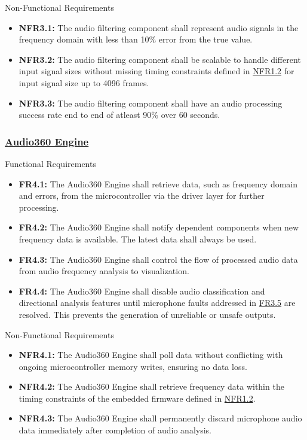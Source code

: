 \documentclass[12pt]{article}
\theoremstyle{definition}
\begin{document}
Non-Functional Requirements
\begin{itemize}
  \item \label{NFR3_1}\textbf{NFR3.1:} The audio filtering component shall
  represent audio signals in the frequency domain with less than 10\% error from
  the true value.
  \item \label{NFR3_2}\textbf{NFR3.2:} The audio filtering component shall be
  scalable to handle different input signal sizes without missing timing
  constraints defined in \hyperref[NFR1_2]{NFR1.2} for input signal size up to
  4096 frames.

  \item \label{NFR3_3}\textbf{NFR3.3:} The audio filtering component shall have
  an audio processing success rate end to end of atleast 90\% over 60 seconds.
\end{itemize}

\subsubsection{\hyperref[comp:audio360Engine]{Audio360 Engine}} Functional
Requirements
\begin{itemize}
  \item \label{FR4_1}\textbf{FR4.1:} The Audio360 Engine shall retrieve data,
  such as frequency domain and errors, from the microcontroller via the driver
  layer for further processing.

  \item \label{FR4_2}\textbf{FR4.2:} The Audio360 Engine shall notify dependent
  components when new frequency data is available. The latest data shall always
  be used.

  \item \label{FR4_3}\textbf{FR4.3:} The Audio360 Engine shall control the flow
  of processed audio data from audio frequency analysis to visualization.

  \item \label{FR4_4}\textbf{FR4.4:} The Audio360 Engine shall disable audio
  classification and directional analysis features until microphone faults
  addressed in \hyperref[FR3_5]{FR3.5} are resolved. This prevents the
  generation of unreliable or unsafe outputs.
\end{itemize}

Non-Functional Requirements
\begin{itemize}
  \item \label{NFR4_1}\textbf{NFR4.1:} The Audio360 Engine shall poll data
  without conflicting with ongoing microcontroller memory writes, ensuring no
  data loss.

  \item \label{NFR4_2}\textbf{NFR4.2:} The Audio360 Engine shall retrieve
  frequency data within the timing constraints of the embedded firmware defined
  in \hyperref[NFR1_2]{NFR1.2}.

  \item \label{NFR4_3}\textbf{NFR4.3:} The Audio360 Engine shall permanently
  discard microphone audio data immediately after completion of audio analysis.
\end{itemize}
\end{document}
